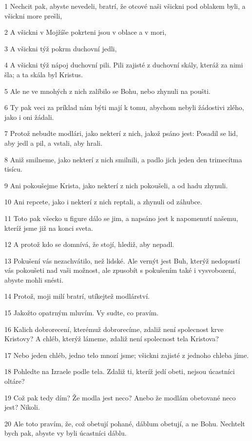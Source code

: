 \par 1 Nechcit pak, abyste nevedeli, bratrí, že otcové naši všickni pod oblakem byli, a všickni more prešli,
\par 2 A všickni v Mojžíše pokrteni jsou v oblace a v mori,
\par 3 A všickni týž pokrm duchovní jedli,
\par 4 A všickni týž nápoj duchovní pili. Pili zajisté z duchovní skály, kteráž za nimi šla; a ta skála byl Kristus.
\par 5 Ale ne ve mnohých z nich zalíbilo se Bohu, nebo zhynuli na poušti.
\par 6 Ty pak veci za príklad nám býti mají k tomu, abychom nebyli žádostivi zlého, jako i oni žádali.
\par 7 Protož nebudte modlári, jako nekterí z nich, jakož psáno jest: Posadil se lid, aby jedl a pil, a vstali, aby hrali.
\par 8 Aniž smilneme, jako nekterí z nich smilnili, a padlo jich jeden den trimecítma tisícu.
\par 9 Ani pokoušejme Krista, jako nekterí z nich pokoušeli, a od hadu zhynuli.
\par 10 Ani repcete, jako i nekterí z nich reptali, a zhynuli od záhubce.
\par 11 Toto pak všecko u figure dálo se jim, a napsáno jest k napomenutí našemu, kteríž jsme již na konci sveta.
\par 12 A protož kdo se domnívá, že stojí, hlediž, aby nepadl.
\par 13 Pokušení vás nezachvátilo, než lidské. Ale vernýt jest Buh, kterýž nedopustí vás pokoušeti nad vaši možnost, ale zpusobít s pokušením také i vysvobození, abyste mohli snésti.
\par 14 Protož, moji milí bratrí, utíkejtež modlárství.
\par 15 Jakožto opatrným mluvím. Vy sudte, co pravím.
\par 16 Kalich dobrorecení, kterémuž dobrorecíme, zdaliž není spolecnost krve Kristovy? A chléb, kterýž lámeme, zdaliž není spolecnost tela Kristova?
\par 17 Nebo jeden chléb, jedno telo mnozí jsme; všickni zajisté z jednoho chleba jíme.
\par 18 Pohledte na Izraele podle tela. Zdaliž ti, kteríž jedí obeti, nejsou úcastníci oltáre?
\par 19 Což pak tedy dím? Že modla jest neco? Anebo že modlám obetované neco jest? Nikoli.
\par 20 Ale toto pravím, že, což obetují pohané, dáblum obetují, a ne Bohu. Nechtelt bych pak, abyste vy byli úcastníci dáblu.
